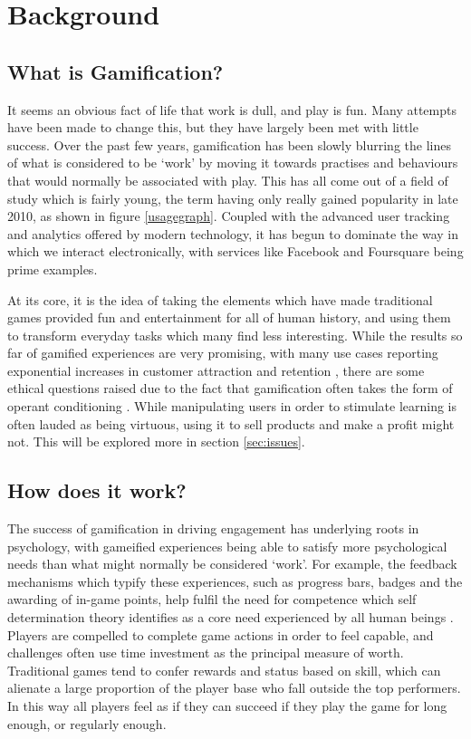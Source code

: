 \documentclass{article}
\begin{document}
\section{Background}
\subsection{What is Gamification?}
It seems an obvious fact of life that work is dull, and play is fun. Many attempts have been made to change this, but they have largely been met with little success. Over the past few years, gamification has been slowly blurring the lines of what is considered to be `work' by moving it towards practises and behaviours that would normally be associated with play. This has all come out of a field of study which is fairly young, the term having only really gained popularity in late 2010, as shown in figure \ref{usagegraph}. Coupled with the advanced user tracking and analytics offered by modern technology, it has begun to dominate the way in which we interact electronically, with services like Facebook and Foursquare being prime examples.

At its core, it is the idea of taking the elements which have made traditional games provided fun and entertainment for all of human history, and using them to transform everyday tasks which many find less interesting. While the results so far of gamified experiences are very promising, with many use cases reporting exponential increases in customer attraction and retention \cite{zichermann2010game}, there are some ethical questions raised due to the fact that gamification often takes the form of operant conditioning \cite{kapp2012gamification}. While manipulating users in order to stimulate learning is often lauded as being virtuous, using it to sell products and make a profit might not. This will be explored more in section \ref{sec:issues}.

\subsection{How does it work?}
The success of gamification in driving engagement has underlying roots in psychology, with gameified experiences being able to satisfy more psychological needs than what might normally be considered `work'. For example, the feedback mechanisms which typify these experiences, such as progress bars, badges and the awarding of in-game points, help fulfil the need for competence which self determination theory identifies as a core need experienced by all human beings \cite{przybylski2010motivational}. Players are compelled to complete game actions in order to feel capable, and challenges often use time investment as the principal measure of worth. Traditional games tend to confer rewards and status based on skill, which can alienate a large proportion of the player base who fall outside the top performers. In this way all players feel as if they can succeed if they play the game for long enough, or regularly enough.
\end{document}
